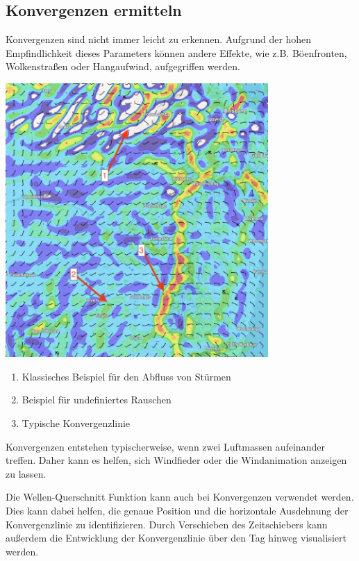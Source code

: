 \documentclass[11pt,a4paper]{article}
\begin{document}
\subsection{Konvergenzen ermitteln}
Konvergenzen sind nicht immer leicht zu erkennen. Aufgrund der hohen Empfindlichkeit dieses Parameters können andere Effekte, wie z.B. Böenfronten, Wolkenstraßen oder Hangaufwind, aufgegriffen werden.

\begin{center}
\includegraphics[width=10cm]{images/convergence.png}
\end{center}

\begin{enumerate}
\item Klassisches Beispiel für den Abfluss von Stürmen
\item Beispiel für undefiniertes Rauschen
\item Typische Konvergenzlinie
\end{enumerate}

Konvergenzen entstehen typischerweise, wenn zwei Luftmassen aufeinander treffen. Daher kann es helfen, sich Windfieder oder die Windanimation anzeigen zu lassen.

Die Wellen-Querschnitt Funktion kann auch bei Konvergenzen verwendet werden. Dies kann dabei helfen, die genaue Position und die horizontale Ausdehnung der Konvergenzlinie zu identifizieren. Durch Verschieben des Zeitschiebers kann außerdem die Entwicklung der Konvergenzlinie über den Tag hinweg visualisiert werden.
\end{document}
